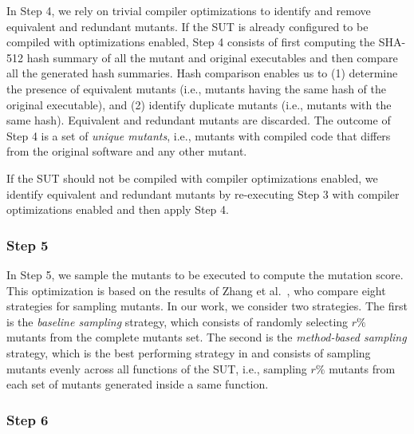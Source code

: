 In Step 4, we rely on trivial compiler optimizations to identify and remove equivalent and redundant mutants. 
If the SUT is already configured to be compiled with optimizations enabled, Step 4 consists of first computing the SHA-512 hash summary of all the mutant and original executables and then compare all the generated hash summaries. Hash comparison enables us to (1) determine the presence of equivalent mutants (i.e., mutants having the same hash of the original executable), and (2) identify duplicate mutants (i.e., mutants with the same hash). %
Equivalent and redundant mutants are discarded.
The outcome of Step 4 is a set of \emph{unique mutants}, i.e., mutants with compiled code that differs from the original software and any other mutant.

If the SUT should not be compiled with compiler optimizations enabled, we identify equivalent and redundant mutants by re-executing Step 3 with compiler optimizations enabled and then apply Step 4.

\subsubsection{Step 5}

In Step 5, we sample the mutants to be executed to compute the mutation score. This optimization is based on the results of Zhang et al.~\cite{zhang2013operator}, who compare eight strategies for sampling mutants. In our work, we consider two strategies. The first is the \emph{baseline sampling} strategy, which consists of randomly selecting $r\%$ mutants from the complete mutants set. The second is the \emph{method-based sampling} strategy, which is the best performing strategy in \cite{zhang2013operator} and consists of sampling mutants evenly across all functions of the SUT, i.e., sampling $r\%$ mutants from each set of mutants generated inside a same function.



\subsubsection{Step 6}

